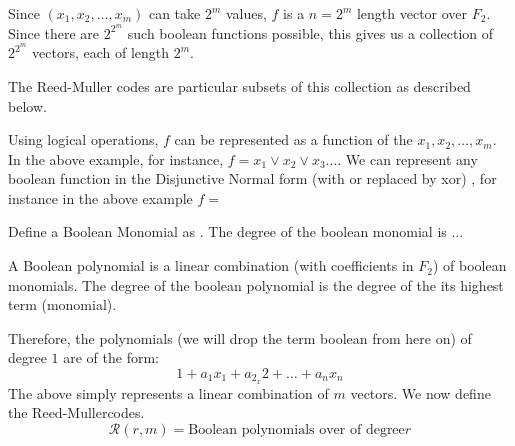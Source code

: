 \documentclass{article}
\newcommand{\RM}[2]{\ensuremath{\mathcal{R}(#1,#2)}}
\newcommand{\rem}{Reed-Muller}
\begin{document}
Since $(x_1,x_2,\ldots,x_m)$ can take $2^m$ values, $f$ is a $n=2^m$ length vector over $F_2$. Since there are $2^2^m$ such boolean functions possible, this gives us a collection of  $2^2^m$ vectors, each of length $2^m$.
 
The Reed-Muller codes are particular subsets of this collection as described below.

Using logical operations, $f$ can be represented as a function of the $x_1, x_2, \ldots , x_m$. In the above example, for instance, $f = x_1 \vee x_2 \vee x_3 ... $. We can represent any boolean function in the Disjunctive Normal form (with or replaced by xor) \cite{Problem2}, for instance in the above example $f = $

Define a Boolean Monomial as .
The degree of the boolean monomial is ...

A Boolean polynomial is a linear combination (with coefficients in $F_2$) of boolean monomials. The degree of the boolean polynomial is the degree of the its highest term (monomial).

Therefore, the polynomials (we will drop the term boolean from here on) of degree $1$ are of the form:
\begin{equation}
 1+a_1x_1+a_2_x2+\ldots+a_nx_n
\end{equation}
The above simply represents a linear combination of $m$ vectors.
We now define the \rem codes.
\begin{equation}

\RM{r}{m} = \text{Boolean polynomials over of degree} r
\end{equation}
\end{document}
